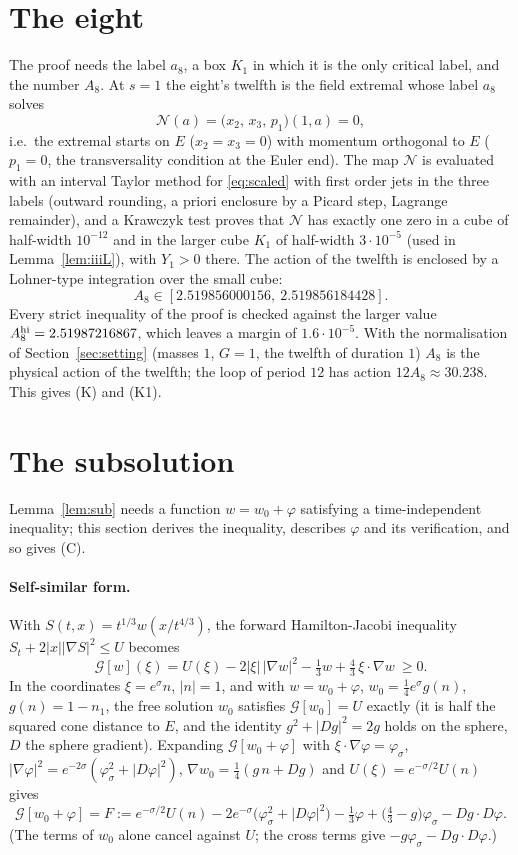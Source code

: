 \documentclass[11pt]{article}
\theoremstyle{definition}
\begin{document}
\section{The eight}\label{sec:eight}
The proof needs the label $a_8$, a box $K_1$ in which it is the only critical label, and the number $A_8$. At $s=1$
the eight's twelfth is the field extremal whose label $a_8$ solves
\[
\mathcal N(a)=\bigl(x_2,\,x_3,\,p_1\bigr)(1,a)=0,
\]
i.e.\ the extremal starts on $E$ ($x_2=x_3=0$) with momentum orthogonal to $E$ ($p_1=0$, the transversality condition
at the Euler end). The map $\mathcal N$ is evaluated with an interval Taylor method for \eqref{eq:scaled} with first
order jets in the three labels (outward rounding, a priori enclosure by a Picard step, Lagrange remainder), and a
Krawczyk test proves that $\mathcal N$ has exactly one zero in a cube of
half-width $10^{-12}$ and in the larger cube $K_1$ of half-width $3\cdot10^{-5}$ (used in Lemma~\ref{lem:iiiL}), with
$Y_1>0$ there. The action of the twelfth is enclosed by a Lohner-type integration over the small cube:
\[
A_8\in[2.519856000156,\ 2.519856184428].
\]
Every strict inequality of the proof is checked against the larger value $A_8^{\rm hi}=2.51987216867$, which leaves
a margin of $1.6\cdot10^{-5}$. With the normalisation of Section~\ref{sec:setting} (masses $1$, $G=1$, the twelfth of
duration $1$) $A_8$ is the physical action of the twelfth; the loop of period $12$ has action $12A_8\approx30.238$.
This gives (K) and (K1).

\section{The subsolution}\label{sec:subsolution}
Lemma~\ref{lem:sub} needs a function $w=w_0+\varphi$ satisfying a time-independent inequality; this section derives the
inequality, describes $\varphi$ and its verification, and so gives (C).

\paragraph{Self-similar form.} With $S(t,x)=t^{1/3}w(x/t^{4/3})$, the forward Hamilton-Jacobi inequality
$S_t+2|x||\nabla S|^2\le U$ becomes
\[
\mathcal G[w](\xi)=U(\xi)-2|\xi|\,|\nabla w|^2-\tfrac13 w+\tfrac43\,\xi\cdot\nabla w\ \ge0 .
\]
In the coordinates $\xi=e^\sigma n$, $|n|=1$, and with $w=w_0+\varphi$, $w_0=\tfrac14e^\sigma g(n)$, $g(n)=1-n_1$, the
free solution $w_0$ satisfies $\mathcal G[w_0]=U$ exactly (it is half the squared cone distance to $E$, and the identity
$g^2+|Dg|^2=2g$ holds on the sphere, $D$ the sphere gradient). Expanding $\mathcal G[w_0+\varphi]$ with
$\xi\cdot\nabla\varphi=\varphi_\sigma$, $|\nabla\varphi|^2=e^{-2\sigma}(\varphi_\sigma^2+|D\varphi|^2)$,
$\nabla w_0=\tfrac14(g\,n+Dg)$ and $U(\xi)=e^{-\sigma/2}U(n)$ gives
\[
\mathcal G[w_0+\varphi]=F:=e^{-\sigma/2}U(n)-2e^{-\sigma}\bigl(\varphi_\sigma^2+|D\varphi|^2\bigr)-\tfrac13\varphi
+\bigl(\tfrac43-g\bigr)\varphi_\sigma-Dg\cdot D\varphi .
\]
(The terms of $w_0$ alone cancel against $U$; the cross terms give $-g\varphi_\sigma-Dg\cdot D\varphi$.)
\end{document}
